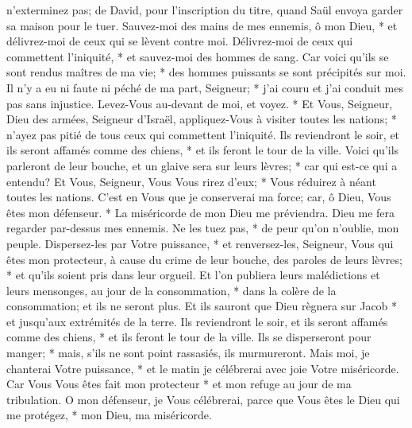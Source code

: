 n'exterminez pas; de David, pour l'inscription du titre, quand Saül envoya garder sa maison pour le tuer.
Sauvez-moi des mains de mes ennemis, ô mon Dieu, * et délivrez-moi de ceux qui se lèvent contre moi.
Délivrez-moi de ceux qui commettent l'iniquité, * et sauvez-moi des hommes de sang.
Car voici qu'ils se sont rendus maîtres de ma vie; * des hommes puissants se sont précipités sur moi.
Il n'y a eu ni faute ni péché de ma part, Seigneur; * j'ai couru et j'ai conduit mes pas sans injustice.
Levez-Vous au-devant de moi, et voyez. * Et Vous, Seigneur, Dieu des armées, Seigneur d'Israël, appliquez-Vous à visiter toutes les nations; * n'ayez pas pitié de tous ceux qui commettent l'iniquité.
Ils reviendront le soir, et ils seront affamés comme des chiens, * et ils feront le tour de la ville.
Voici qu'ils parleront de leur bouche, et un glaive sera sur leurs lèvres; * car qui est-ce qui a entendu?
Et Vous, Seigneur, Vous Vous rirez d'eux; * Vous réduirez à néant toutes les nations.
C'est en Vous que je conserverai ma force; car, ô Dieu, Vous êtes mon défenseur. *
La miséricorde de mon Dieu me préviendra.
Dieu me fera regarder par-dessus mes ennemis. Ne les tuez pas, * de peur qu'on n'oublie, mon peuple. Dispersez-les par Votre puissance, * et renversez-les, Seigneur, Vous qui êtes mon protecteur,
à cause du crime de leur bouche, des paroles de leurs lèvres; * et qu'ils soient pris dans leur orgueil. Et l'on publiera leurs malédictions et leurs mensonges,
au jour de la consommation, * dans la colère de la consommation; et ils ne seront plus. Et ils sauront que Dieu règnera sur Jacob * et jusqu'aux extrémités de la terre.
Ils reviendront le soir, et ils seront affamés comme des chiens, * et ils feront le tour de la ville.
Ils se disperseront pour manger; * mais, s'ils ne sont point rassasiés, ils murmureront.
Mais moi, je chanterai Votre puissance, * et le matin je célébrerai avec joie Votre miséricorde. Car Vous Vous êtes fait mon protecteur * et mon refuge au jour de ma tribulation.
O mon défenseur, je Vous célébrerai, parce que Vous êtes le Dieu qui me protégez, * mon Dieu, ma miséricorde.

